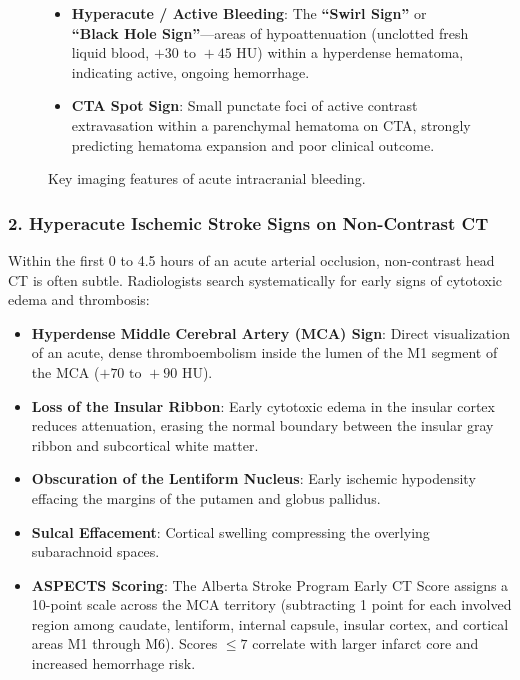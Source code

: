 \documentclass[11pt,a4paper]{article}
\begin{document}
\begin{figure}[htbp]
\centering
\begin{tcolorbox}[colback=teal!5!white,colframe=teal!75!black,arc=1mm,title=\sffamily Diagnostic Signatures of Intracranial Hemorrhage]
\small
\begin{itemize}
    \item \textbf{Hyperacute / Active Bleeding}: The \textbf{``Swirl Sign''} or \textbf{``Black Hole Sign''}—areas of hypoattenuation (unclotted fresh liquid blood, $+30\text{ to }+45\text{ HU}$) within a hyperdense hematoma, indicating active, ongoing hemorrhage.
    \item \textbf{CTA Spot Sign}: Small punctate foci of active contrast extravasation within a parenchymal hematoma on CTA, strongly predicting hematoma expansion and poor clinical outcome.
\end{itemize}
\end{tcolorbox}
\caption{Key imaging features of acute intracranial bleeding.}
\label{fig:ich_patterns}
\end{figure}

\subsubsection{2. Hyperacute Ischemic Stroke Signs on Non-Contrast CT}
Within the first 0 to 4.5 hours of an acute arterial occlusion, non-contrast head CT is often subtle. Radiologists search systematically for early signs of cytotoxic edema and thrombosis:
\begin{itemize}
    \item \textbf{Hyperdense Middle Cerebral Artery (MCA) Sign}: Direct visualization of an acute, dense thromboembolism inside the lumen of the M1 segment of the MCA ($+70\text{ to }+90\text{ HU}$).
    \item \textbf{Loss of the Insular Ribbon}: Early cytotoxic edema in the insular cortex reduces attenuation, erasing the normal boundary between the insular gray ribbon and subcortical white matter.
    \item \textbf{Obscuration of the Lentiform Nucleus}: Early ischemic hypodensity effacing the margins of the putamen and globus pallidus.
    \item \textbf{Sulcal Effacement}: Cortical swelling compressing the overlying subarachnoid spaces.
    \item \textbf{ASPECTS Scoring}: The Alberta Stroke Program Early CT Score assigns a 10-point scale across the MCA territory (subtracting 1 point for each involved region among caudate, lentiform, internal capsule, insular cortex, and cortical areas M1 through M6). Scores $\leq 7$ correlate with larger infarct core and increased hemorrhage risk.
\end{itemize}
\end{document}
